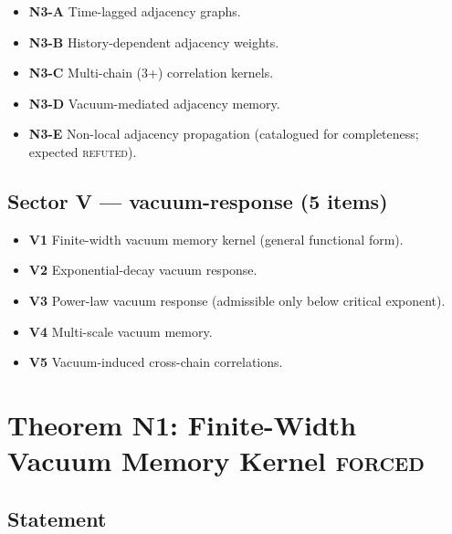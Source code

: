 \documentclass[11pt,a4paper]{article}
\begin{document}
\begin{itemize}
  \item \textbf{N3-A} Time-lagged adjacency graphs.
  \item \textbf{N3-B} History-dependent adjacency weights.
  \item \textbf{N3-C} Multi-chain (3+) correlation kernels.
  \item \textbf{N3-D} Vacuum-mediated adjacency memory.
  \item \textbf{N3-E} Non-local adjacency propagation (catalogued for completeness; expected \textsc{refuted}).
\end{itemize}

\subsection{Sector V --- vacuum-response (5 items)}

\begin{itemize}
  \item \textbf{V1} Finite-width vacuum memory kernel (general functional form).
  \item \textbf{V2} Exponential-decay vacuum response.
  \item \textbf{V3} Power-law vacuum response (admissible only below critical exponent).
  \item \textbf{V4} Multi-scale vacuum memory.
  \item \textbf{V5} Vacuum-induced cross-chain correlations.
\end{itemize}

\section{Theorem N1: Finite-Width Vacuum Memory Kernel \textsc{forced}}

\subsection{Statement}
\end{document}
